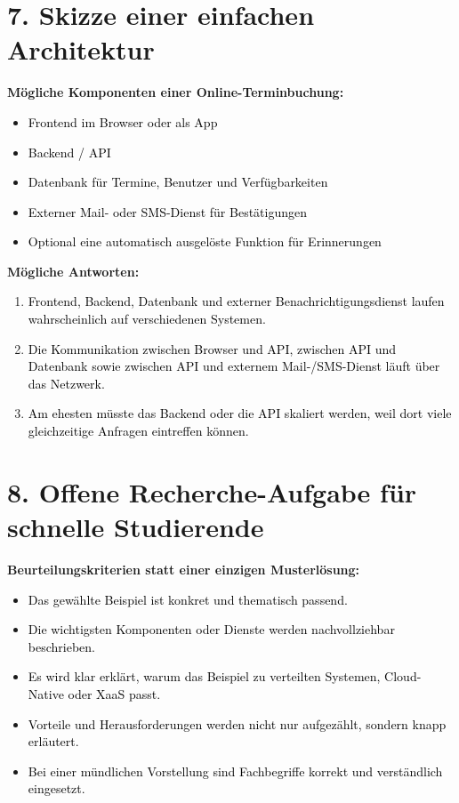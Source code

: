 \documentclass[11pt,a4paper]{article}
\newcommand{\solution}[1]{\textcolor{black}{#1}}
\begin{document}
\section*{7. Skizze einer einfachen Architektur}
\textbf{M\"ogliche Komponenten einer Online-Terminbuchung:}
\begin{itemize}
  \item \solution{Frontend im Browser oder als App}
  \item \solution{Backend / API}
  \item \solution{Datenbank f\"ur Termine, Benutzer und Verf\"ugbarkeiten}
  \item \solution{Externer Mail- oder SMS-Dienst f\"ur Best\"atigungen}
  \item \solution{Optional eine automatisch ausgel\"oste Funktion f\"ur Erinnerungen}
\end{itemize}

\textbf{M\"ogliche Antworten:}
\begin{enumerate}
  \item \solution{Frontend, Backend, Datenbank und externer Benachrichtigungsdienst laufen wahrscheinlich auf verschiedenen Systemen.}
  \item \solution{Die Kommunikation zwischen Browser und API, zwischen API und Datenbank sowie zwischen API und externem Mail-/SMS-Dienst l\"auft \"uber das Netzwerk.}
  \item \solution{Am ehesten m\"usste das Backend oder die API skaliert werden, weil dort viele gleichzeitige Anfragen eintreffen k\"onnen.}
\end{enumerate}

\section*{8. Offene Recherche-Aufgabe f\"ur schnelle Studierende}
\textbf{Beurteilungskriterien statt einer einzigen Musterl\"osung:}
\begin{itemize}
  \item \solution{Das gew\"ahlte Beispiel ist konkret und thematisch passend.}
  \item \solution{Die wichtigsten Komponenten oder Dienste werden nachvollziehbar beschrieben.}
  \item \solution{Es wird klar erkl\"art, warum das Beispiel zu verteilten Systemen, Cloud-Native oder XaaS passt.}
  \item \solution{Vorteile und Herausforderungen werden nicht nur aufgez\"ahlt, sondern knapp erl\"autert.}
  \item \solution{Bei einer m\"undlichen Vorstellung sind Fachbegriffe korrekt und verst\"andlich eingesetzt.}
\end{itemize}
\end{document}
